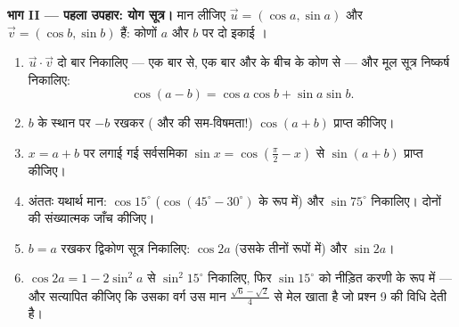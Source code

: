 \begin{problem}
\medskip
\noindent\textbf{भाग II --- पहला उपहार: योग सूत्र।}
मान लीजिए $\vec u = (\cos a, \sin a)$ और $\vec v = (\cos b, \sin b)$ हैं: कोणों $a$ और $b$ पर दो इकाई ।
\begin{enumerate}[resume]
  \item $\vec u \cdot \vec v$ दो बार निकालिए --- एक बार  से, एक बार 
        और  के बीच के कोण से --- और मूल सूत्र निष्कर्ष निकालिए:
        \[
        \cos(a - b) = \cos a \cos b + \sin a \sin b .
        \]
  \item $b$ के स्थान पर $-b$ रखकर ( और  की सम-विषमता!) $\cos(a + b)$
        प्राप्त कीजिए।
  \item $x = a + b$ पर लगाई गई  सर्वसमिका $\sin x = \cos\left(\frac\pi2 - x\right)$ से $\sin(a + b)$ प्राप्त कीजिए।
  \item अंततः यथार्थ मान: $\cos 15^\circ$ ($\cos(45^\circ - 30^\circ)$ के रूप में) और $\sin 75^\circ$ निकालिए। दोनों
        की संख्यात्मक जाँच कीजिए।
  \item $b = a$ रखकर द्विकोण सूत्र निकालिए: $\cos 2a$ (उसके तीनों रूपों में) और
        $\sin 2a$।
  \item $\cos 2a = 1 - 2\sin^2 a$ से $\sin^2 15^\circ$ निकालिए, फिर $\sin 15^\circ$ को नीड़ित करणी के रूप में ---
        और सत्यापित कीजिए कि उसका वर्ग उस मान $\frac{\sqrt6 - \sqrt2}{4}$ से मेल खाता है जो
        प्रश्न 9 की विधि देती है।
\end{enumerate}


\end{problem}

